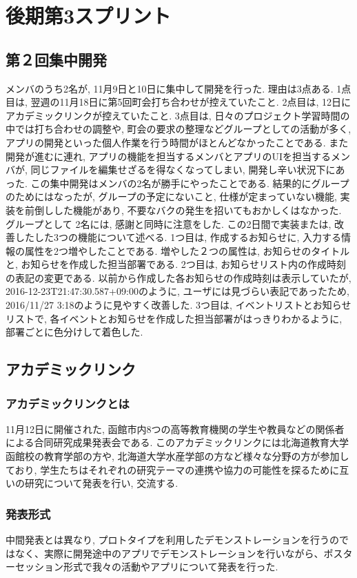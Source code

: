 \section{後期第3スプリント}
\subsection{第２回集中開発}
メンバのうち2名が, 11月9日と10日に集中して開発を行った. 理由は3点ある. 1点目は, 翌週の11月18日に第5回町会打ち合わせが控えていたこと.
2点目は, 12日にアカデミックリンクが控えていたこと. 3点目は, 日々のプロジェクト学習時間の中では打ち合わせの調整や, 町会の要求の整理などグループとしての活動が多く,
アプリの開発といった個人作業を行う時間がほとんどなかったことである. また開発が進むに連れ, アプリの機能を担当するメンバとアプリのUIを担当するメンバが, 同じファイルを編集せざるを得なくなってしまい,
開発し辛い状況下にあった. この集中開発はメンバの2名が勝手にやったことである. 結果的にグループのためにはなったが, グループの予定にないこと, 仕様が定まっていない機能, 実装を前倒しした機能があり,
不要なバクの発生を招いてもおかしくはなかった. グループとして 2名には, 感謝と同時に注意をした. この2日間で実装または, 改善したした3つの機能について述べる. 1つ目は, 作成するお知らせに,
入力する情報の属性を2つ増やしたことである. 増やした２つの属性は, お知らせのタイトルと, お知らせを作成した担当部署である. 2つ目は, お知らせリスト内の作成時刻の表記の変更である.
以前から作成した各お知らせの作成時刻は表示していたが, 2016-12-23T21:47:30.587+09:00のように, ユーザには見づらい表記であったため, 2016/11/27 3:18のように見やすく改善した.
3つ目は, イベントリストとお知らせリストで, 各イベントとお知らせを作成した担当部署がはっきりわかるように, 部署ごとに色分けして着色した.

\subsection{アカデミックリンク}
\subsubsection{アカデミックリンクとは}
11月12日に開催された, 函館市内8つの高等教育機関の学生や教員などの関係者による合同研究成果発表会である.
このアカデミックリンクには北海道教育大学函館校の教育学部の方や, 北海道大学水産学部の方など様々な分野の方が参加しており,
学生たちはそれぞれの研究テーマの連携や協力の可能性を探るために互いの研究について発表を行い, 交流する.
\subsubsection{発表形式}
中間発表とは異なり, プロトタイプを利用したデモンストレーションを行うのではなく、実際に開発途中のアプリでデモンストレーションを行いながら、ポスターセッション形式で我々の活動やアプリについて発表を行った.
